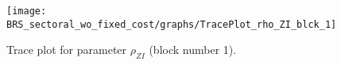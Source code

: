 \begin{figure}[H]
\centering
  \texttt{[image: BRS\_sectoral\_wo\_fixed\_cost/graphs/TracePlot\_rho\_ZI\_blck\_1]}\\
    \caption{Trace plot for parameter ${\rho_{ZI}}$ (block number 1).}
\end{figure}
